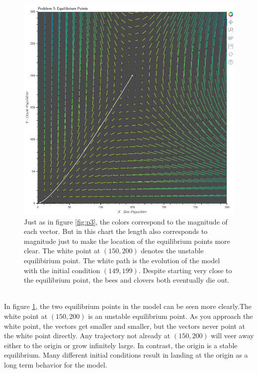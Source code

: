 \documentclass[12pt,a4paper,titlepage]{report}
\begin{document}
		\begin{figure}[htbp]
			\centerline{\includegraphics[scale=.5]{charts/problem5_chart.png}}
			\caption{Just as in figure \ref{fig:p3}, the colors correspond to the magnitude of each vector. But in this chart the length also corresponds to magnitude just to make the location of the equilibrium points more clear. The white point at \((150,200)\) denotes the unstable equilibirium point. The white path is the evolution of the model with the initial condition \((149,199)\). Despite starting very close to the equilibrium point, the bees and clovers both eventually die out.}
			\label{fig:p5}
		\end{figure}\\
		In figure \ref{fig:p5}, the two equilibrium points in the model can be seen more clearly.The white point at \((150,200)\) is an unstable equilibrium point. As you approach the white point, the vectors get smaller and smaller, but the vectors never point at the white point directly. Any trajectory not already at \((150,200)\) will veer away either to the origin or grow infinitely large. In contrast, the origin is a stable equilibrium. Many different initial conditions result in landing at the origin as a long term behavior for the model. 
\end{document}
